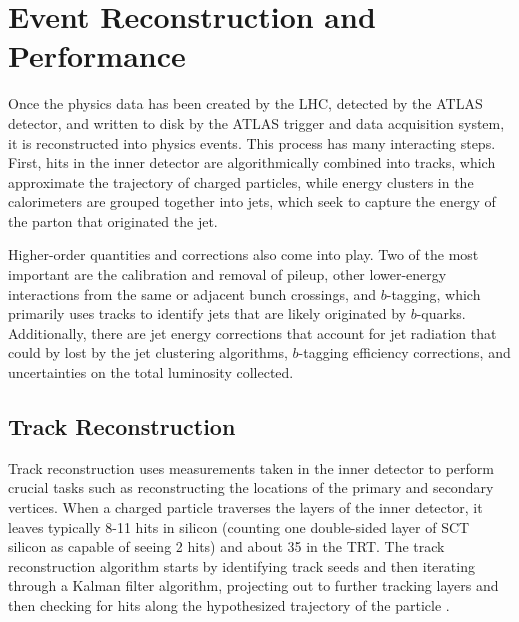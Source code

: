  

\chapter[Reconstruction and Performance]{Event Reconstruction and Performance}
Once the physics data has been created by the LHC, detected by the ATLAS detector, and written to 
disk by the ATLAS trigger and data acquisition system, it is reconstructed into physics events.  This process has 
many interacting steps.  First, hits in the inner detector are algorithmically combined into tracks, which approximate the 
trajectory of charged particles, while energy clusters in the calorimeters are grouped together into jets, which seek to 
capture the energy of the parton that originated the jet.  

Higher-order quantities and corrections also come into play.  Two of the most important are the calibration and removal of 
pileup, other lower-energy interactions from the same or adjacent bunch crossings, and $b$-tagging, 
which primarily uses tracks to identify jets that are likely originated by $b$-quarks.  Additionally, 
there are jet energy corrections that account for jet radiation that could by lost by the jet clustering algorithms, 
$b$-tagging efficiency corrections, and uncertainties on the total luminosity collected. 



\section{Track Reconstruction}
\label{sec:trk_reco}
Track reconstruction uses measurements taken in the inner detector 
to perform crucial tasks such as reconstructing the locations of the primary and secondary vertices.  
When a charged particle traverses the layers of the inner detector, it leaves typically 8-11 hits in 
silicon (counting one double-sided layer of SCT silicon as capable of seeing 2 hits) and about 
35 in the TRT.  The track reconstruction algorithm  
starts by identifying track seeds and then iterating through a Kalman filter algorithm, projecting out to further tracking layers 
and then checking for hits along the hypothesized trajectory of the particle \cite{newt}.  

